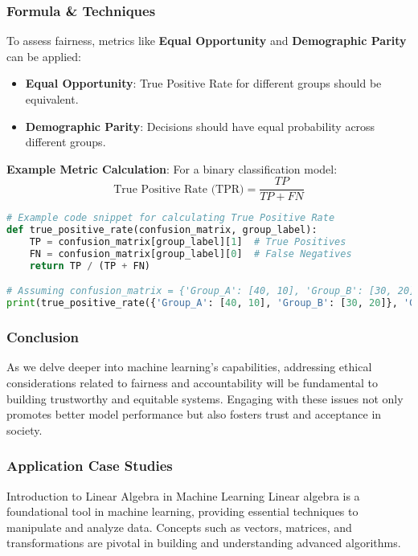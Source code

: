 \documentclass{beamer}
\begin{document}
\begin{frame}[fragile]
    \frametitle{Formula & Techniques}
    To assess fairness, metrics like \textbf{Equal Opportunity} and \textbf{Demographic Parity} can be applied:
    \begin{itemize}
        \item \textbf{Equal Opportunity}: True Positive Rate for different groups should be equivalent.
        \item \textbf{Demographic Parity}: Decisions should have equal probability across different groups.
    \end{itemize}

    \textbf{Example Metric Calculation}:
    For a binary classification model:
    \begin{equation}
        \text{True Positive Rate (TPR)} = \frac{TP}{TP + FN}
    \end{equation}

    \begin{lstlisting}[language=python]
# Example code snippet for calculating True Positive Rate
def true_positive_rate(confusion_matrix, group_label):
    TP = confusion_matrix[group_label][1]  # True Positives
    FN = confusion_matrix[group_label][0]  # False Negatives
    return TP / (TP + FN)

# Assuming confusion_matrix = {'Group_A': [40, 10], 'Group_B': [30, 20]}
print(true_positive_rate({'Group_A': [40, 10], 'Group_B': [30, 20]}, 'Group_A'))
    \end{lstlisting}
\end{frame}

\begin{frame}[fragile]
    \frametitle{Conclusion}
    As we delve deeper into machine learning's capabilities, addressing ethical considerations related to fairness and accountability will be fundamental to building trustworthy and equitable systems. Engaging with these issues not only promotes better model performance but also fosters trust and acceptance in society.
\end{frame}

\begin{frame}[fragile]
    \frametitle{Application Case Studies}
    \begin{block}{Introduction to Linear Algebra in Machine Learning}
        Linear algebra is a foundational tool in machine learning, providing essential techniques to manipulate and analyze data. Concepts such as vectors, matrices, and transformations are pivotal in building and understanding advanced algorithms.
    \end{block}
\end{frame}
\end{document}
